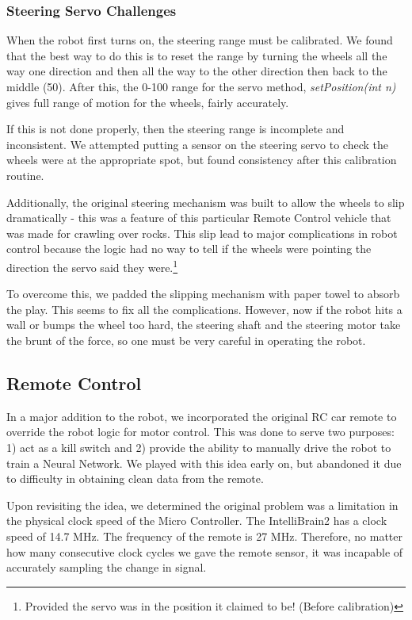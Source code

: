 \documentclass[12pt]{article}
\begin{document}
\subsubsection*{Steering Servo Challenges}
When the robot first turns on, the steering range must be calibrated.  We found that the best way to do this is to reset the range by turning the wheels all the way one direction and then all the way to the other direction then back to the middle (50).  After this, the 0-100 range for the servo method, \textit{setPosition(int n)} gives full range of motion for the wheels, fairly accurately.

If this is not done properly, then the steering range is incomplete and inconsistent.  We attempted putting a sensor on the steering servo to check the wheels were at the appropriate spot, but found consistency after this calibration routine.
\vspace{2mm}

Additionally, the original steering mechanism was built to allow the wheels to slip dramatically - this was a feature of this particular Remote Control vehicle that was made for crawling over rocks.  This slip lead to major complications in robot control because the logic had no way to tell if the wheels were pointing the direction the servo said they were.\footnote{Provided the servo was in the position it claimed to be! (Before calibration)}

To overcome this, we padded the slipping mechanism with paper towel to absorb the play.  This seems to fix all the complications.  However, now if the robot hits a wall or bumps the wheel too hard, the steering shaft and the steering motor take the brunt of the force, so one must be very careful in operating the robot.


\clearpage
\subsection{Remote Control}
In a major addition to the robot, we incorporated the original RC car remote to override the robot logic for motor control.  This was done to serve two purposes: 1) act as a kill switch and 2) provide the ability to manually drive the robot to train a Neural Network.  We played with this idea early on, but abandoned it due to difficulty in obtaining clean data from the remote.

Upon revisiting the idea, we determined the original problem was a limitation in the physical clock speed of the Micro Controller.  The IntelliBrain2 has a clock speed of 14.7 MHz.  The frequency of the remote is 27 MHz.  Therefore, no matter how many consecutive clock cycles we gave the remote sensor, it was incapable of accurately sampling the change in signal.
\end{document}
